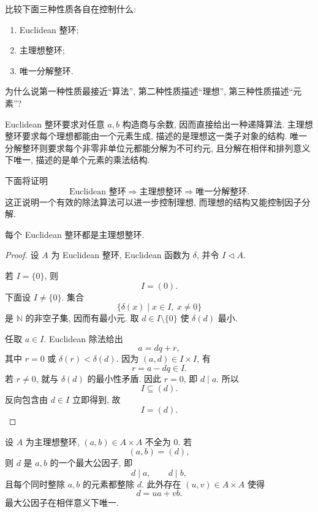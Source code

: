 \documentclass[usesamecnt, thmcnt=section, lang=cn, newtx, 10pt, scheme=chinese]{elegantbook}
\begin{document}
\begin{concept}\label{con:alg-pid-ufd-euclidean}
比较下面三种性质各自在控制什么:
\begin{enumerate}[label=\rm(\arabic*)]
  \item Euclidean 整环;
  \item 主理想整环;
  \item 唯一分解整环.
\end{enumerate}
为什么说第一种性质最接近``算法'', 第二种性质描述``理想'', 第三种性质描述``元素''?
\end{concept}

\begin{solution}
Euclidean 整环要求对任意 $a,b$ 构造商与余数, 因而直接给出一种递降算法. 主理想整环要求每个理想都能由一个元素生成, 描述的是理想这一类子对象的结构. 唯一分解整环则要求每个非零非单位元都能分解为不可约元, 且分解在相伴和排列意义下唯一, 描述的是单个元素的乘法结构.

下面将证明
\[
 \text{Euclidean 整环}
 \Longrightarrow
 \text{主理想整环}
 \Longrightarrow
 \text{唯一分解整环}.
\]
这正说明一个有效的除法算法可以进一步控制理想, 而理想的结构又能控制因子分解.
\end{solution}

\begin{theorem}\label{thm:alg-euclidean-pid}
每个 Euclidean 整环都是主理想整环.
\end{theorem}

\begin{proof}
设 $A$ 为 Euclidean 整环, Euclidean 函数为 $\delta$, 并令 $I\triangleleft A$.

若 $I=\{0\}$, 则
\[
 I=(0).
\]
下面设 $I\neq\{0\}$. 集合
\[
 \{\delta(x)\mid x\in I,\ x\neq0\}
\]
是 $\mathbb N$ 的非空子集, 因而有最小元. 取 $d\in I\setminus\{0\}$ 使 $\delta(d)$ 最小.

任取 $a\in I$. Euclidean 除法给出
\[
 a=dq+r,
\]
其中 $r=0$ 或 $\delta(r)<\delta(d)$. 因为 $(a,d)\in I\times I$, 有
\[
 r=a-dq\in I.
\]
若 $r\neq0$, 就与 $\delta(d)$ 的最小性矛盾. 因此 $r=0$, 即 $d\mid a$. 所以
\[
 I\subseteq(d).
\]
反向包含由 $d\in I$ 立即得到, 故
\[
 I=(d).
\]
\end{proof}

\begin{proposition}\label{prop:alg-pid-bezout}
设 $A$ 为主理想整环, $(a,b)\in A\times A$ 不全为 $0$. 若
\[
 (a,b)=(d),
\]
则 $d$ 是 $a,b$ 的一个最大公因子, 即
\[
 d\mid a,\qquad d\mid b,
\]
且每个同时整除 $a,b$ 的元素都整除 $d$. 此外存在 $(u,v)\in A\times A$ 使得
\[
 d=ua+vb.
\]
最大公因子在相伴意义下唯一.
\end{proposition}
\end{document}
